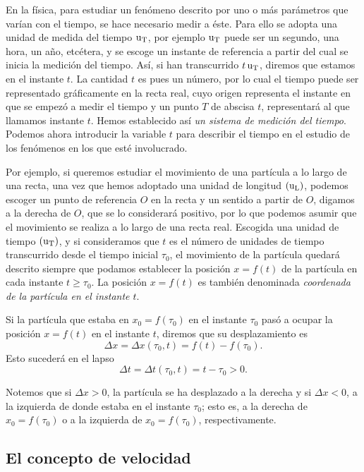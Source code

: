 En la física, para estudiar un fenómeno descrito por uno o más parámetros que varían con el tiempo,
se hace necesario medir a éste. Para ello se adopta una unidad de medida del tiempo $\operatorname{u_T}$, por
ejemplo $\operatorname{u_T}$ puede ser un segundo, una hora, un año, etcétera, y se escoge un instante de
referencia a partir del cual se inicia la medición del tiempo. Así, si han transcurrido $t \operatorname{u_T}$,
diremos que estamos en el instante $t$. La cantidad $t$ es pues un número, por lo cual el tiempo
puede ser representado gráficamente en la recta real, cuyo origen representa el instante en que se
empezó a medir el tiempo y un punto $T$ de abscisa $t$, representará al que llamamos instante $t$.
Hemos establecido así \emph{un sistema de medición del tiempo}. Podemos ahora introducir la
variable $t$ para describir el tiempo en el estudio de los fenómenos en los que esté involucrado.

Por ejemplo, si queremos estudiar el movimiento de una partícula a lo largo de una recta, una vez
que hemos adoptado una unidad de longitud $(\operatorname{u_L})$, podemos escoger un punto de referencia $O$ en la
recta y un sentido a partir de $O$, digamos a la derecha de $O$, que se lo considerará positivo,
por lo que podemos asumir que el movimiento se realiza a lo largo de una recta real. Escogida una
unidad de tiempo $(\operatorname{u_T})$, y si consideramos que $t$ es el número de unidades de tiempo transcurrido
desde el tiempo inicial $\tau_{0}$, el movimiento de la partícula quedará descrito siempre que
podamos establecer la posición $x = f(t)$ de la partícula en cada instante $t\geq \tau_{0}$. La
posición $x = f(t)$ es también denominada \emph{coordenada de la partícula en el instante $t$}.

Si la partícula que estaba en $x_{0} = f(\tau_0)$ en el instante $\tau_0$ pasó a ocupar la posición
$x = f(t)$ en el instante $t$, diremos que su desplazamiento es
\[
\Delta x = \Delta x(\tau_0, t) = f(t) - f(\tau_0).
\]
Esto sucederá en el lapso
\[
\Delta t = \Delta t(\tau_0, t) = t - \tau_0>0.
\]

Notemos que si $\Delta x>0$, la partícula se ha desplazado a la derecha y si $\Delta x<0$, a la
izquierda de donde estaba en el instante $\tau_0$; esto es, a la derecha de $x_{0}= f(\tau_0)$ o a
la izquierda de $x_{0} = f(\tau_0)$, respectivamente.

\subsection{El concepto de velocidad}

